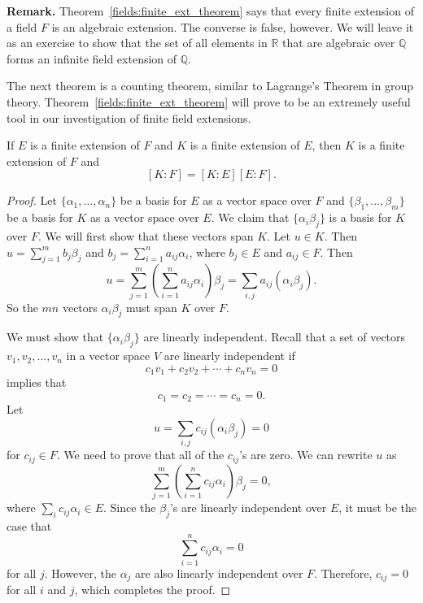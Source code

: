 \medskip


\noindent \textbf{Remark.} 
Theorem~\ref{fields:finite_ext_theorem} says that every finite extension of a field $F$ is an
algebraic extension. The converse is false, however. We will leave it
as an exercise to show that the set of all elements in ${\mathbb R}$ that
are algebraic over ${\mathbb Q}$ forms an infinite field extension of ${\mathbb
Q}$. 


\medskip


The next theorem is a counting theorem, similar to Lagrange's Theorem
in group theory. Theorem~\ref{fields:finite_ext_theorem} will prove to be an extremely useful
tool in our investigation of finite field extensions. 
 

\begin{theorem}\label{fields:tower_indices_theorem}
If $E$ is a finite extension of $F$ and $K$ is a finite extension of
$E$, then $K$ is a finite extension of $F$ and 
\[ 
[K:F]= [K:E] [E:F].
\]
\end{theorem}
 

\begin{proof}
Let $\{ \alpha_1, \ldots, \alpha_n \}$ be a basis for $E$ as a vector
space over $F$ and $\{ \beta_1, \ldots, \beta_m \}$ be a basis for
$K$ as a vector space over $E$. We claim that $\{ \alpha_i \beta_j
\}$ is a basis for $K$ over $F$.  
We will first show that these vectors span $K$. Let $u \in K$. Then $u
= \sum_{j=1}^{m} b_j \beta_j$ and $b_j = \sum_{i=1}^{n} a_{ij}
\alpha_i$, where $b_j \in E$ and $a_{ij} \in F$.	Then 
\[
u = \sum_{j=1}^{m} \left(  \sum_{i=1}^{n} a_{ij}
\alpha_i  \right) \beta_j = \sum_{i,j} a_{ij} ( \alpha_i
\beta_j ).
\]
So the $mn$ vectors $\alpha_i \beta_j$ must span $K$ over $F$. 


We must show that $\{ \alpha_i \beta_j \}$ are linearly independent.
Recall that a set of vectors $v_1, v_2, \ldots, v_n$ in a vector
space $V$ are linearly independent if 
\[
c_1 v_1 + c_2 v_2 + \cdots + c_n v_n = 0
\]
implies that
\[
c_1 = c_2 = \cdots = c_n = 0.
\]
Let 
\[
u = \sum_{i,j} c_{ij} ( \alpha_i \beta_j ) = 0
\]
for $c_{ij} \in F$. We need to prove that all of the $c_{ij}$'s are
zero. We can rewrite $u$ as
\[
\sum_{j=1}^{m} \left(  \sum_{i=1}^{n} c_{ij} \alpha_i
\right) \beta_j = 0,
\]
where $\sum_i c_{ij} \alpha_i \in E$.  Since the $\beta_j$'s are
linearly independent over $E$, it must be the case that 
\[
\sum_{i=1}^n c_{ij} \alpha_i = 0
\]
for all $j$. However, the $\alpha_j$ are also linearly independent 
over $F$.  Therefore, $c_{ij} = 0$ for all $i$ and $j$, which
completes the proof.
\end{proof}


